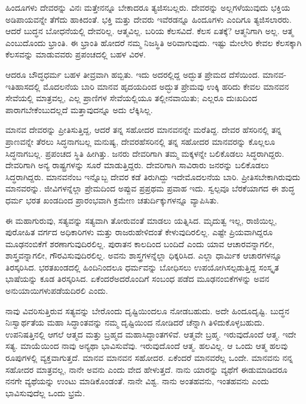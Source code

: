 ಹಿಂದೂಗಳು ದೇವರನ್ನು ವಿನಃ ಮತ್ತೇನನ್ನೂ ಬೇಕಾದರೂ ತ್ಯಜಿಸಬಲ್ಲರು. ದೇವರನ್ನು ಅಲ್ಲಗಳೆಯುವುದು ಭಕ್ತಿಯ ಅಡಿಪಾಯವನ್ನೇ ತೆಗೆದು ಹಾಕಿದಂತೆ. ಭಕ್ತಿ ಮತ್ತು ದೇವರು ಇವೆರಡನ್ನೂ ಹಿಂದೂಗಳು ಎಂದಿಗೂ ತ್ಯಜಿಸಲಾರರು. ಆದರೆ ಬುದ್ಧನ ಬೋಧನೆ\-ಯಲ್ಲಿ ದೇವರಿಲ್ಲ. ಆತ್ಮವಿಲ್ಲ. ಬರಿಯ ಕೆಲಸವಿದೆ. ಕೆಲಸ ಏತಕ್ಕೆ? ಆತ್ಮನಿಗಾಗಿ ಅಲ್ಲ. ಆತ್ಮ ಎಂಬುದೊಂದು ಭ್ರಾಂತಿ. ಈ ಭ್ರಾಂತಿ ಹೋದರೆ ನಮ್ಮ ನಿಜಸ್ಥಿತಿ ಅರಿವಾಗುವುದು. ಇಷ್ಟು ಮೇಲೇರಿ ಕೇವಲ ಕೆಲಸಕ್ಕಾಗಿ ಕೆಲಸವನ್ನು ಮಾಡುವವರು ಪ್ರಪಂಚದಲ್ಲಿ ಬಹಳ ವಿರಳ.

ಆದರೂ ಬೌದ್ಧಧರ್ಮ ಬಹಳ ತೀವ್ರವಾಗಿ ಹಬ್ಬಿತು. ಇದು ಅದರಲ್ಲಿದ್ದ ಅದ್ಭುತ ಪ್ರೇಮದ ದೆಸೆಯಿಂದ. ಮಾನವ-ಇತಿಹಾಸದಲ್ಲಿ ಮೊದಲನೆಯ ಬಾರಿ ಮಾನವ ಹೃದಯದಿಂದ ಅದ್ಭುತ ಪ್ರೇಮವು ಉಕ್ಕಿ ಹರಿದು ಕೇವಲ ಮಾನವನ ಸೇವೆಯಲ್ಲಿ ಮಾತ್ರವಲ್ಲ, ಎಲ್ಲ ಪ್ರಾಣಿಗಳ ಸೇವೆಯಲ್ಲಿಯೂ ತಲ್ಲೀನವಾಯಿತು; ಎಲ್ಲರೂ ದುಃಖದಿಂದ ಪಾರಾಗಬೇಕೆಂಬುದಲ್ಲದೆ ಮತ್ತಾವುದನ್ನೂ ಅದು ಲೆಕ್ಕಿಸಿಲ್ಲ.

\vskip 0.1cm

ಮಾನವ ದೇವರನ್ನು ಪ್ರೀತಿಸುತ್ತಿದ್ದ, ಆದರೆ ತನ್ನ ಸಹೋದರ ಮಾನವನನ್ನೇ ಮರೆತಿದ್ದ. ದೇವರ ಹೆಸರಿನಲ್ಲಿ ತನ್ನ ಪ್ರಾಣವನ್ನೇ ತೆರಲು ಸಿದ್ಧನಾಗಬಲ್ಲ ಮನುಷ್ಯ, ದೇವರ\break ಹೆಸರಿನಲ್ಲಿ ತನ್ನ ಸಹೋದರ ಮಾನವರನ್ನು ಕೊಲ್ಲಲೂ ಸಿದ್ಧನಾಗಬಲ್ಲ. ಪ್ರಪಂಚದ ಸ್ಥಿತಿ ಹೀಗಿತ್ತು. ಜನರು ದೇವರಿಗಾಗಿ ತಮ್ಮ ಮಕ್ಕಳನ್ನೇ ಬಲಿಕೊಡಲು ಸಿದ್ಧರಾಗಿದ್ದರು. ದೇವರಿಗಾಗಿ ಅನ್ಯ ರಾಷ್ಟ್ರಗಳನ್ನು ಸೂರೆ ಮಾಡುತ್ತಿದ್ದರು. ದೇವರಿಗಾಗಿ ಸಾವಿರಾರು ಜನರನ್ನು ಬಲಿಕೊಡಲು ಸಿದ್ಧರಾಗಿದ್ದರು. ಮಾನವನೆಂಬ ಇನ್ನೊಬ್ಬ ದೇವರ ಕಡೆ ತಿರುಗಿದ್ದು ಇದೇ\break ಮೊದಲನೆಯ ಬಾರಿ. ಪ್ರೀತಿಸಬೇಕಾಗಿರುವುದು ಮಾನವರನ್ನು. ಜೀವಿಗಳನ್ನೆಲ್ಲಾ ಪ್ರೇಮದಿಂದ ಅಪ್ಪುವ ಪ್ರಪ್ರಥಮ ಪ್ರವಾಹ ಇದು. ಸ್ವಲ್ಪವೂ ಬೆರಕೆಯಾಗದ ಈ ಶುದ್ಧ ಧರ್ಮ ಭರತ ಖಂಡದಿಂದ ಪ್ರಾರಂಭವಾಗಿ ಕ್ರಮೇಣ ಚತುರ್ದಿಕ್ಕುಗಳನ್ನೂ ವ್ಯಾಪಿಸಿತು.

\vskip 0.1cm

ಈ ಮಹಾಗುರುವು, ಸತ್ಯವನ್ನು ಸತ್ಯವಾಗಿ ತೋರುವಂತೆ ಮಾಡಲು ಯತ್ನಿಸಿದ. ಮೃದುತ್ವ ಇಲ್ಲ, ರಾಜಿಯಿಲ್ಲ, ಪುರೋಹಿತ ವರ್ಗದ ಅಧಿಕಾರಿಗಳು ಮತ್ತು ರಾಜರು\break ಹೇಳಿದಂತೆ ಕೇಳುವುದಿರಲಿಲ್ಲ. ಎಷ್ಟೇ ಪ್ರಿಯವಾಗಿದ್ದರೂ ಮೂಢನಂಬಿಕೆಗೆ ಶರಣಾಗುವು\-ದಿರಲಿಲ್ಲ. ಪುರಾತನ ಕಾಲದಿಂದ ಬಂದಿದೆ ಎಂದು ಯಾವ ಆಚಾರವನ್ನಾಗಲೀ, ಶಾಸ್ತ್ರವನ್ನಾಗಲೀ, ಗೌರವಿಸುವುದಿರಲಿಲ್ಲ. ಅವನು ಶಾಸ್ತ್ರಗಳನ್ನೆಲ್ಲಾ ಧಿಕ್ಕರಿಸಿದ. ಎಲ್ಲಾ ಧಾರ್ಮಿಕ ಆಚಾರಗಳನ್ನೂ ತಿರಸ್ಕರಿಸಿದ. ಭರತಖಂಡದಲ್ಲಿ ಹಿಂದಿನಿಂದಲೂ ಧರ್ಮವನ್ನು ಬೋಧಿಸಲು ಉಪಯೋಗಿಸಲ್ಪಡುತ್ತಿದ್ದ ಸಂಸ್ಕೃತ ಭಾಷೆಯನ್ನು ಕೂಡ ತಿರಸ್ಕರಿಸಿದ. ಏಕೆಂದರೆ\break ಅದರೊಂದಿಗೆ ಸಂಬಂಧ ಪಡೆದ ಮೂಢನಂಬಿಕೆಗಳನ್ನು ಅವನ ಅನುಯಾಯಿಗಳು\break ಪಡೆಯದಿರಲಿ ಎಂದು.

\vskip 0.1cm

ನಾವು ವಿವರಿಸುತ್ತಿರುವ ಸತ್ಯವನ್ನು ಬೇರೊಂದು ದೃಷ್ಟಿಯಿಂದಲೂ ನೋಡಬಹುದು. ಅದೇ ಹಿಂದೂದೃಷ್ಟಿ. ಬುದ್ಧನ ನಿಃಸ್ವಾರ್ಥತೆಯ ಮಹಾ ಸಿದ್ಧಾಂತವನ್ನು ನಮ್ಮ ದೃಷ್ಟಿಯಿಂದ ನೋಡಿದರೆ ಚೆನ್ನಾಗಿ ತಿಳಿದುಕೊಳ್ಳಬಹುದು. ಉಪನಿಷತ್ತಿನಲ್ಲಿ ಆಗಲೆ ಆತ್ಮದ ಮತ್ತು ಬ್ರಹ್ಮದ ಮಹಾಸಿದ್ಧಾಂತಗಳಿವೆ. ಆತ್ಮವೇ ಬ್ರಹ್ಮ. ಇರುವುದೊಂದೆ ಆತ್ಮ. ಇದೇ ಸತ್ಯ. ಮಾಯೆಯಿಂದ ನಾವು ಅನ್ಯಥಾ ಭಾವಿಸುವೆವು. ಇರುವುದೊಂದೆ ಆತ್ಮ. ಹಲವಿಲ್ಲ. ಆ ಒಂದು ಆತ್ಮ ಹಲವು ರೂಪುಗಳಲ್ಲಿ ವ್ಯಕ್ತವಾಗುತ್ತದೆ. ಮಾನವ ಮಾನವನ ಸಹೋದರ. ಏಕೆಂದರೆ ಮಾನವರೆಲ್ಲ ಒಂದೇ. ಮಾನವನು ನನ್ನ ಸಹೋದರ ಮಾತ್ರವಲ್ಲ, ನಾನೇ ಅವನು ಎಂದು ವೇದ ಹೇಳುತ್ತದೆ. ನಾನು ಯಾರನ್ನು ವ್ಯಥೆಗೆ ಈಡುಮಾಡಿದರೂ ನನಗೇ ವ್ಯಥೆಯನ್ನು ಉಂಟು ಮಾಡಿಕೊಂಡಂತೆ. ನಾನೇ ವಿಶ್ವ. ನಾನು ಅಂತಹವನು, ಇಂತಹವನು ಎಂದು ಭಾವಿಸುವುದೆಲ್ಲ ಒಂದು ಭ್ರಮೆ.

